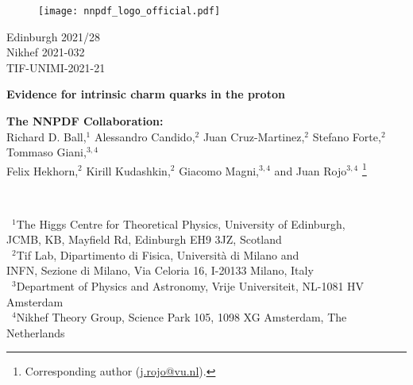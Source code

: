 \documentclass[11pt,a4paper]{article}
\newcounter{daggerfootnote}
\newcommand*{\daggerfootnote}[1]{%
    \setcounter{daggerfootnote}{\value{footnote}}%
    \renewcommand*{\thefootnote}{\fnsymbol{footnote}}%
    \footnote[2]{#1}%
    \setcounter{footnote}{\value{daggerfootnote}}%
    \renewcommand*{\thefootnote}{\arabic{footnote}}%
}
\begin{document}
\begin{figure}[h]
  \texttt{[image: nnpdf\_logo\_official.pdf]}
\end{figure}
\vspace{-2.0cm}
\begin{flushright}
Edinburgh 2021/28\\
Nikhef 2021-032\\
TIF-UNIMI-2021-21
\end{flushright}
\vspace{0.3cm}

\vspace{1.1cm}
\begin{center}
  
 {{\LARGE \bf Evidence for intrinsic charm quarks in the proton}}

  \vspace{1.1cm}

  {\small
  {\bf  The NNPDF Collaboration:} \\[0.2cm]
  Richard D. Ball,$^{1}$
  Alessandro Candido,$^{2}$
Juan Cruz-Martinez,$^{2}$
Stefano Forte,$^{2}$
Tommaso Giani,$^{3,4}$\\[0.1cm]
Felix Hekhorn,$^{2}$
Kirill Kudashkin,$^{2}$
Giacomo Magni,$^{3,4}$ and
Juan Rojo$^{3,4}$\daggerfootnote{Corresponding author (\href{mailto:ic/j.rojo@vu.nl}{j.rojo@vu.nl}).}
}\\


 \vspace{0.7cm}
 
 {\it \small

 ~$^1$The Higgs Centre for Theoretical Physics, University of Edinburgh,\\
   JCMB, KB, Mayfield Rd, Edinburgh EH9 3JZ, Scotland\\[0.1cm]
    ~$^2$Tif Lab, Dipartimento di Fisica, Universit\`a di Milano and\\
   INFN, Sezione di Milano, Via Celoria 16, I-20133 Milano, Italy\\[0.1cm]
    ~$^3$Department of Physics and Astronomy, Vrije Universiteit, NL-1081 HV Amsterdam\\[0.1cm]
~$^4$Nikhef Theory Group, Science Park 105, 1098 XG Amsterdam, The Netherlands\\[0.1cm]


   }

\vspace{1.0cm}

\end{center}
\end{document}
